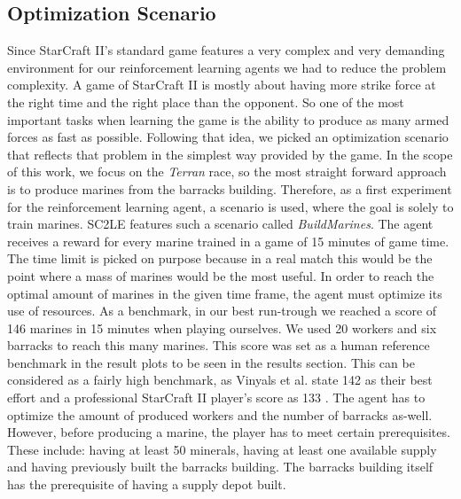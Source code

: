 \documentclass[12pt,a4paper]{article}
\begin{document}
\subsection{Optimization Scenario}\label{sec:scenario}
Since StarCraft II's standard game features a very complex and very demanding environment for our reinforcement learning agents we had to reduce the problem complexity.
A game of StarCraft II is mostly about having more strike force at the right time and the right place than the opponent.
So one of the most important tasks when learning the game is the ability to produce as many armed forces as fast as possible. Following that idea, we picked an optimization scenario that reflects that problem in the simplest way provided by the game.
In the scope of this work, we focus on the {\it Terran} race, so the most straight forward approach is to produce marines from the barracks building.
Therefore, as a first experiment for the reinforcement learning agent, a scenario is used, where the goal is solely to train marines. SC2LE features such a scenario called {\it BuildMarines}.
The agent receives a reward for every marine trained in a game of 15 minutes of game time. The time limit is picked on purpose because in a real match this would be the point where a mass of marines would be the most useful.
In order to reach the optimal amount of marines in the given time frame, the agent must optimize its use of resources.
As a benchmark, in our best run-trough we reached a score of 146 marines in 15 minutes when playing ourselves. We used 20 workers and six barracks to reach this many marines. This score was set as a human reference benchmark in the result plots to be seen in the results section. This can be considered as a fairly high benchmark, as Vinyals et al. state 142 as their best effort and a professional StarCraft II player's score as 133 \cite{DBLP:journals/corr/abs-1708-04782}.
The agent has to optimize the amount of produced workers and the number of barracks as-well.
However, before producing a marine, the player has to meet certain prerequisites. These include: having at least 50 minerals, having at least one available supply and having previously built the barracks building. The barracks building itself has the prerequisite of having a supply depot built.
\end{document}
